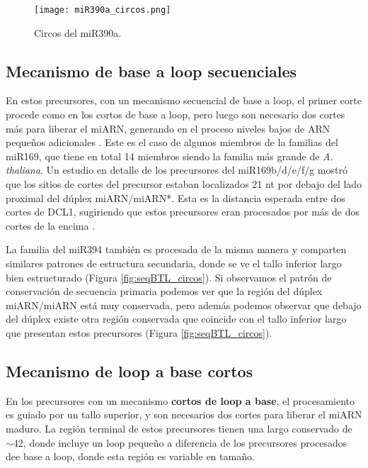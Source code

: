 \begin{figure}[htbp!] 
    \centering    
    \texttt{[image: miR390a\_circos.png]}
    \caption[Circos del miR172a]{Circos del miR390a.}
     \label{fig:miR390a_circos}
\end{figure}

\subsection{Mecanismo de base a loop secuenciales}

En estos precursores, con un mecanismo secuencial de base a loop, el primer corte procede como en los cortos de base a loop, pero luego son necesario dos cortes más para liberar el miARN, generando en el proceso niveles bajos de ARN pequeños adicionales \citep{Bologna2013}.
Este es el caso de algunos miembros de la  familias del miR169, que tiene en total 14 miembros siendo la familia más grande de \textit{A. thaliana}.
Un estudio en detalle de los precursores del miR169b/d/e/f/g mostró que los sitios de cortes del precursor estaban localizados 21 nt por debajo del lado proximal del dúplex miARN/miARN*.
Esta es la distancia esperada entre dos cortes de DCL1, sugiriendo que estos precursores eran procesados por más de dos cortes de la encima \citep{Bologna2013}.

La familia del miR394 también es procesada de la misma manera y comparten similares patrones de estructura secundaria, donde se ve el tallo inferior largo bien estructurado (Figura \ref{fig:seqBTL_circos}).
Si observamos el patrón de conservación de secuencia primaria podemos ver que la región del dúplex miARN/miARN está muy conservada, pero además podemos observar que debajo del dúplex existe otra región conservada que coincide con el tallo inferior largo que presentan estos precursores (Figura \ref{fig:seqBTL_circos}).

\subsection{Mecanismo de loop a base cortos}

En los precursores con un mecanismo \textbf{cortos de loop a base}, el procesamiento es guiado por un tallo superior, y son necesarios dos cortes para liberar el miARN maduro.
La región terminal de estos precursores tienen una largo conservado de $\sim$42, donde incluye un loop pequeño \citep{Bologna2013} a diferencia de los precursores procesados dee base a loop, donde esta región es variable en tamaño.

